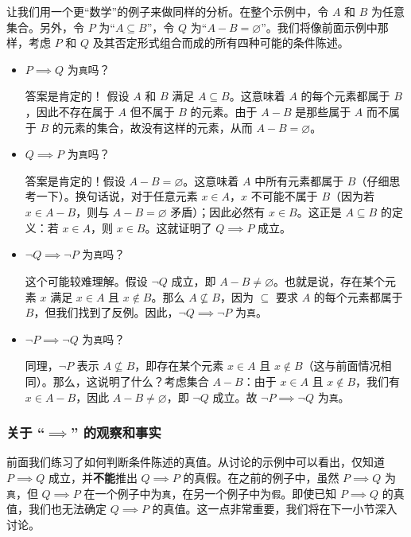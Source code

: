 \begin{example}
    让我们用一个更``数学''的例子来做同样的分析。在整个示例中，令 $A$ 和 $B$ 为任意集合。另外，令 $P$ 为``$A \subseteq B$''，令 $Q$ 为``$A - B = \varnothing$''。我们将像前面示例中那样，考虑 $P$ 和 $Q$ 及其否定形式组合而成的所有四种可能的条件陈述。
    \begin{itemize}
        \item $P \implies Q$ 为\verb|真|吗？

            答案是肯定的！ 假设 $A$ 和 $B$ 满足 $A \subseteq B$。这意味着 $A$ 的每个元素都属于 $B$，因此不存在属于 $A$ 但不属于 $B$ 的元素。由于 $A - B$ 是那些属于 $A$ 而不属于 $B$ 的元素的集合，故没有这样的元素，从而 $A - B = \varnothing$。

        \item $Q \implies P$ 为\verb|真|吗？

            答案是肯定的！假设 $A - B = \varnothing$。这意味着 $A$ 中所有元素都属于 $B$（仔细思考一下）。换句话说，对于任意元素 $x \in A$，$x$ 不可能不属于 $B$（因为若 $x \in A - B$，则与 $A - B = \varnothing$ 矛盾）；因此必然有 $x \in B$。这正是 $A \subseteq B$ 的定义：若 $x \in A$，则 $x \in B$。这就证明了 $Q \implies P$ 成立。

        \item $\neg Q \implies \neg P$ 为\verb|真|吗？

            这个可能较难理解。假设 $\neg Q$ 成立，即 $A - B \ne \varnothing$。也就是说，存在某个元素 $x$ 满足 $x \in A$ 且 $x \notin B$。那么 $A \nsubseteq B$，因为 $\subseteq$ 要求 $A$ 的每个元素都属于 $B$，但我们找到了反例。因此，$\neg Q \implies \neg P$ 为\verb|真|。

        \item $\neg P \implies \neg Q$ 为\verb|真|吗？
            
            同理，$\neg P$ 表示 $A \nsubseteq B$，即存在某个元素 $x \in A$ 且 $x \notin B$（这与前面情况相同）。那么，这说明了什么？考虑集合 $A - B$：由于 $x \in A$ 且 $x \notin B$，我们有 $x \in A - B$，因此 $A - B \ne \varnothing$，即 $\neg Q$ 成立。故 $\neg P \implies \neg Q$ 为\verb|真|。
    \end{itemize}
\end{example}

\subsubsection*{关于 ``$\implies$'' 的观察和事实}

前面我们练习了如何判断条件陈述的真值。从讨论的示例中可以看出，仅知道 $P \implies Q$ 成立，并\textbf{不能}推出 $Q \implies P$ 的真假。在之前的例子中，虽然 $P \implies Q$ 为\verb|真|，但 $Q \implies P$ 在一个例子中为\verb|真|，在另一个例子中为\verb|假|。即使已知 $P \implies Q$ 的真值，我们也无法确定 $Q \implies P$ 的真值。这一点非常重要，我们将在下一小节深入讨论。

